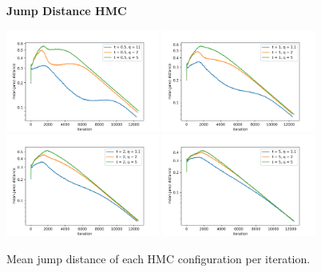 \documentclass[12pt, a4paper]{report}
\begin{document}
\begin{figure}
    \centering
    {\small \textbf{Jump Distance HMC} \par}
    \includegraphics[width=0.45\textwidth]{figs/results/params/jump_distances_hmc_t_05}
    \includegraphics[width=0.45\textwidth]{figs/results/params/jump_distances_hmc_t_1}
    \includegraphics[width=0.45\textwidth]{figs/results/params/jump_distances_hmc_t_2}
    \includegraphics[width=0.45\textwidth]{figs/results/params/jump_distances_hmc_t_5}
    \caption{Mean jump distance of each HMC configuration per iteration.}
    \label{fig:results_params_jump_distances_hmc}
\end{figure}
\end{document}

